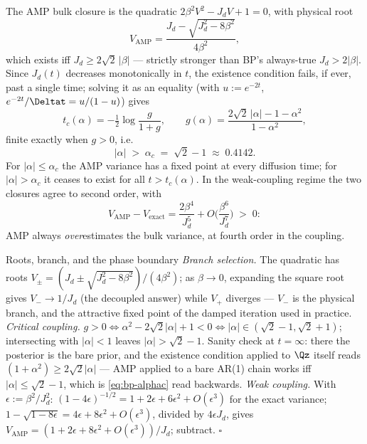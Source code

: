 \begin{theorem}
\label{thm:bp-amp-breakdown}
The AMP bulk closure is the quadratic $2\beta^2 V^2 - J_d V + 1 = 0$, with
physical root
\begin{equation}
  V_{\mathrm{AMP}}
  = \frac{J_d - \sqrt{J_d^2 - 8\beta^2}}{4\beta^2},
  \label{eq:bp-amp-var}
\end{equation}
which exists iff $J_d \geq 2\sqrt{2}\,|\beta|$ --- strictly stronger than
BP's always-true $J_d > 2|\beta|$. Since $J_d(t)$ decreases monotonically
in $t$, the existence condition fails, if ever, past a single time; solving
it as an equality (with $u := e^{-2t}$, $e^{-2t}/\Deltat = u/(1-u)$) gives
\begin{equation}
  \boxed{\;
  t_c(\alpha) = -\tfrac{1}{2} \log \frac{g}{1+g},
  \qquad
  g(\alpha) = \frac{2\sqrt{2}\,|\alpha| - 1 - \alpha^2}{1 - \alpha^2},
  \;}
  \label{eq:bp-tc}
\end{equation}
finite exactly when $g > 0$, i.e.
\begin{equation}
  \boxed{\;|\alpha| \;>\; \alpha_c \;=\; \sqrt{2} - 1 \;\approx\; 0.4142 .\;}
  \label{eq:bp-alphac}
\end{equation}
For $|\alpha| \leq \alpha_c$ the AMP variance has a fixed point at every
diffusion time; for $|\alpha| > \alpha_c$ it ceases to exist for all
$t > t_c(\alpha)$. In the weak-coupling regime the two closures agree to
second order, with
\begin{equation}
  V_{\mathrm{AMP}} - V_{\mathrm{exact}}
  = \frac{2\beta^4}{J_d^5} + O\!\Big(\frac{\beta^6}{J_d^7}\Big)
  \;>\; 0 :
  \label{eq:bp-weak}
\end{equation}
AMP always \emph{over}estimates the bulk variance, at fourth order in the
coupling.
\end{theorem}

\begin{toolbox}{Roots, branch, and the phase boundary}
\emph{Branch selection.} The quadratic has roots
$V_\pm = (J_d \pm \sqrt{J_d^2 - 8\beta^2})/(4\beta^2)$; as $\beta \to 0$,
expanding the square root gives $V_- \to 1/J_d$ (the decoupled answer)
while $V_+$ diverges --- $V_-$ is the physical branch, and the attractive
fixed point of the damped iteration used in practice.
\emph{Critical coupling.} $g > 0 \iff \alpha^2 - 2\sqrt{2}|\alpha| + 1 < 0
\iff |\alpha| \in (\sqrt{2}-1, \sqrt{2}+1)$; intersecting with
$|\alpha| < 1$ leaves $|\alpha| > \sqrt{2} - 1$. Sanity check at
$t = \infty$: there the posterior is the bare prior, and the existence
condition applied to $\Qz$ itself reads $(1 + \alpha^2) \geq
2\sqrt{2}|\alpha|$ --- AMP applied to a bare AR(1) chain works iff
$|\alpha| \leq \sqrt{2} - 1$, which is \eqref{eq:bp-alphac} read
backwards. \emph{Weak coupling.} With $\epsilon := \beta^2/J_d^2$:
$(1 - 4\epsilon)^{-1/2} = 1 + 2\epsilon + 6\epsilon^2 + O(\epsilon^3)$
for the exact variance;
$1 - \sqrt{1 - 8\epsilon} = 4\epsilon + 8\epsilon^2 + O(\epsilon^3)$,
divided by $4\epsilon J_d$, gives
$V_{\mathrm{AMP}} = (1 + 2\epsilon + 8\epsilon^2 + O(\epsilon^3))/J_d$;
subtract. \hfill$\square$
\end{toolbox}

